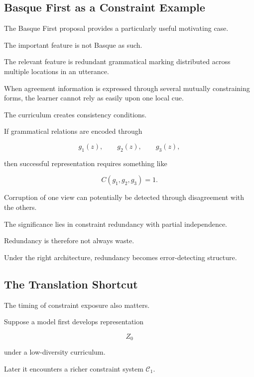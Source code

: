 \documentclass[11pt]{article}
\theoremstyle{remark}
\begin{document}
\subsection{Basque First as a Constraint Example}

The Basque First proposal provides a particularly useful motivating case.

The important feature is not Basque as such.

The relevant feature is redundant grammatical marking distributed across multiple locations in an utterance.

When agreement information is expressed through several mutually constraining forms, the learner cannot rely as easily upon one local cue.

The curriculum creates consistency conditions.

If grammatical relations are encoded through

\begin{equation}
g_1(z),
\qquad
g_2(z),
\qquad
g_3(z),
\end{equation}

then successful representation requires something like

\begin{equation}
C(g_1,g_2,g_3)=1.
\end{equation}

Corruption of one view can potentially be detected through disagreement with the others.

The significance lies in constraint redundancy with partial independence.

Redundancy is therefore not always waste.

Under the right architecture, redundancy becomes error-detecting structure.

\subsection{The Translation Shortcut}

The timing of constraint exposure also matters.

Suppose a model first develops representation

\begin{equation}
Z_0
\end{equation}

under a low-diversity curriculum.

Later it encounters a richer constraint system $\mathcal{C}_1$.
\end{document}

